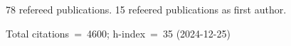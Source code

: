78 refereed publications. 15 refeered publications as first author.

Total citations~=~4600; h-index~=~35 (2024-12-25)